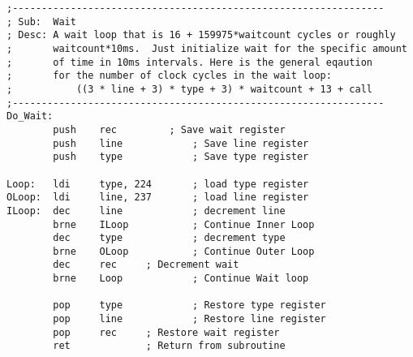 \documentclass[10pt,letterpaper]{article}
\begin{document}
\begin{verbatim}
;----------------------------------------------------------------
; Sub:	Wait
; Desc:	A wait loop that is 16 + 159975*waitcount cycles or roughly
;		waitcount*10ms.  Just initialize wait for the specific amount
;		of time in 10ms intervals. Here is the general eqaution
;		for the number of clock cycles in the wait loop:
;			((3 * line + 3) * type + 3) * waitcount + 13 + call
;----------------------------------------------------------------
Do_Wait:
		push	rec			; Save wait register
		push	line			; Save line register
		push	type			; Save type register

Loop:	ldi		type, 224		; load type register
OLoop:	ldi		line, 237		; load line register
ILoop:	dec		line			; decrement line
		brne	ILoop			; Continue Inner Loop
		dec		type		    ; decrement type
		brne	OLoop			; Continue Outer Loop
		dec		rec		; Decrement wait
		brne	Loop			; Continue Wait loop

		pop		type		    ; Restore type register
		pop		line		    ; Restore line register
		pop		rec		; Restore wait register
		ret				; Return from subroutine
\end{verbatim}
\end{document}
